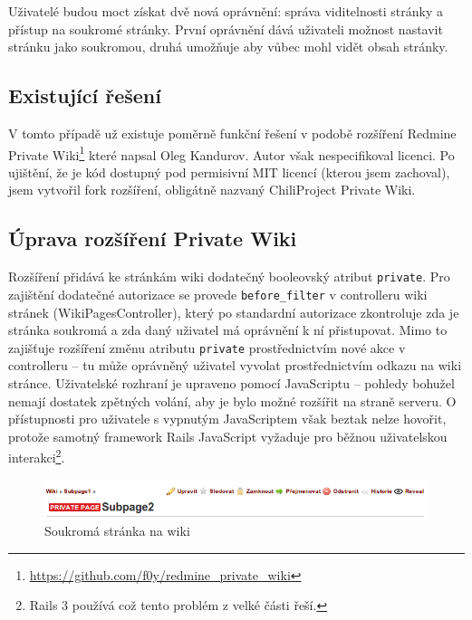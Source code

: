 \documentclass[thesis=B,czech]{FITthesis}[2012/05/02]
\begin{document}
Uživatelé budou moct získat dvě nová oprávnění: správa viditelnosti
stránky a přístup na soukromé stránky. První oprávnění dává uživateli
možnost nastavit stránku jako soukromou, druhá umožňuje aby vůbec mohl
vidět obsah stránky.

\subsection{Existující řešení}

V tomto případě už existuje poměrně funkční řešení v podobě rozšíření
Redmine Private Wiki\footnote{\url{https://github.com/f0y/redmine_private_wiki}}
které napsal Oleg Kandurov. Autor však nespecifikoval licenci. Po
ujištění, že je kód dostupný pod permisivní MIT licencí (kterou jsem
zachoval), jsem vytvořil \gls{fork} rozšíření, obligátně nazvaný
ChiliProject Private Wiki.

\subsection{Úprava rozšíření Private Wiki}

Rozšíření přidává ke stránkám wiki dodatečný booleovský atribut
\lstinline!private!. Pro zajištění dodatečné autorizace se provede
\lstinline!before_filter! v controlleru wiki stránek
(WikiPagesController), který po standardní autorizace zkontroluje zda je
stránka soukromá a zda daný uživatel má oprávnění k ní přistupovat. Mimo
to zajišťuje rozšíření změnu atributu \lstinline!private!
prostřednictvím nové akce v controlleru -- tu může oprávněný uživatel
vyvolat prostřednictvím odkazu na wiki stránce. Uživatelské rozhraní je
upraveno pomocí JavaScriptu -- pohledy bohužel nemají dostatek zpětných
volání, aby je bylo možné rozšířit na straně serveru. O přístupnosti pro
uživatele s vypnutým JavaScriptem však beztak nelze hovořit, protože
samotný framework Rails JavaScript vyžaduje pro běžnou uživatelskou
interakci\footnote{Rails 3 používá 
  což tento problém z velké části řeší.}.

\begin{figure}[tbp]
\centering
\centerline{\includegraphics[width=1.2\textwidth]{wiki-gui1.png}}
\caption{Soukromá stránka na wiki}
\label{fig:GUIPrivateWiki}
\end{figure}
\end{document}

